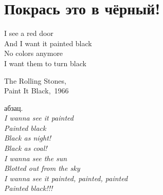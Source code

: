 \chapter{Покрась это в чёрный!} 

\setlength{\epigraphwidth}{0.45\textwidth}

\epigraph{%
	I see a red door \\
	And I want it painted black \\
	No colors anymore \\
	I want them to turn black }
	{
	\begin{flushright}
		\small{The Rolling Stones,\\Paint It Black,~1966}
	\end{flushright}
	}


абзац.\\
\textit{
\hspace*{35mm} I wanna see it painted\\
\hspace*{35mm} Painted black\\
\hspace*{35mm} Black as night!\\
\hspace*{35mm} Black as coal!\\
\hspace*{35mm} I wanna see the sun\\
\hspace*{35mm} Blotted out from the sky\\
\hspace*{35mm} I wanna see it painted, painted, painted\\
\hspace*{35mm} Painted black!!!
}
\begin{center}
\end{center}
